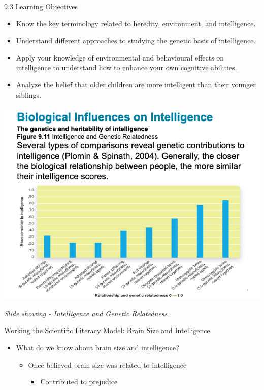 \documentclass[
]{book}
\providecommand{\tightlist}{%
  \setlength{\itemsep}{0pt}\setlength{\parskip}{0pt}}
\begin{document}
\begin{reflect}
9.3 Learning Objectives

\begin{itemize}
\tightlist
\item
  Know the key terminology related to heredity, environment, and intelligence.\\
\item
  Understand different approaches to studying the genetic basis of intelligence.\\
\item
  Apply your knowledge of environmental and behavioural effects on intelligence to understand how to enhance your own cognitive abilities.\\
\item
  Analyze the belief that older children are more intelligent than their younger siblings.
\end{itemize}

\includegraphics{assets/unit_2/slide_36.png}

\emph{Slide showing - Intelligence and Genetic Relatedness}

Working the Scientific Literacy Model: Brain Size and Intelligence

\begin{itemize}
\tightlist
\item
  What do we know about brain size and intelligence?

  \begin{itemize}
  \tightlist
  \item
    Once believed brain size was related to intelligence

    \begin{itemize}
    \tightlist
    \item
      Contributed to prejudice
    \end{itemize}
  \end{itemize}
\end{itemize}


\end{reflect}
\end{document}
